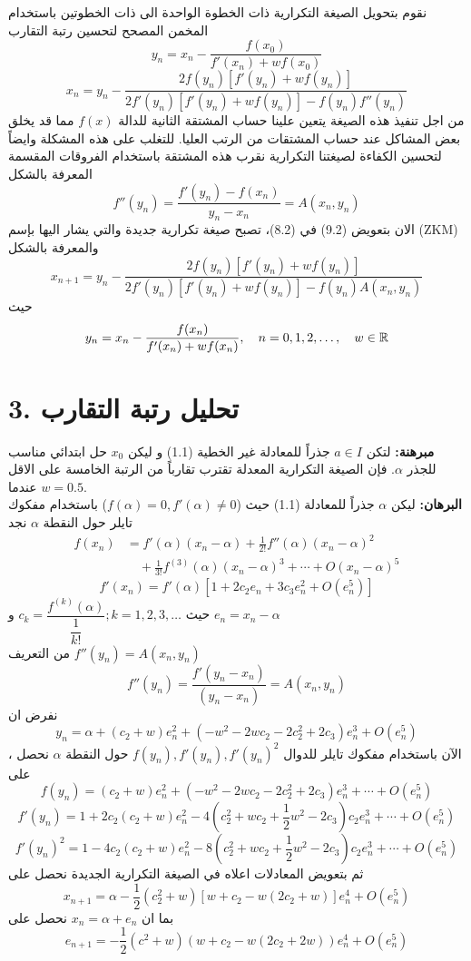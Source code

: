 نقوم بتحويل الصيغة التكرارية ذات الخطوة الواحدة الى ذات الخطوتين باستخدام المخمن المصحح لتحسين رتبة التقارب
\[
y_n = x_n - \frac{f(x_0)}{f'(x_n)+wf(x_0)}
\]
\begin{equation}
x_{n} = y_n - \frac{2f(y_n)[f'(y_n)+wf(y_n)]}{2f'(y_n)[f'(y_n)+wf(y_n)] - f(y_n)f''(y_n)} 
\end{equation}
من اجل تنفيذ هذه الصيغة يتعين علينا حساب المشتقة الثانية للدالة $f(x)$ مما قد يخلق بعض المشاكل عند حساب المشتقات من الرتب العليا. للتغلب على هذه المشكلة وايضاً لتحسين الكفاءة لصيغتنا التكرارية نقرب هذه المشتقة باستخدام الفروقات المقسمة المعرفة بالشكل
\begin{equation}
f''(y_n) = \frac{f'(y_n) - f(x_n)}{y_n - x_n} = A(x_n, y_n)
\end{equation}
الان بتعويض (9.2) في (8.2)، تصبح صيغة تكرارية جديدة والتي يشار اليها بإسم (ZKM) والمعرفة بالشكل
\begin{equation}
x_{n+1} = y_n - \frac{2f(y_n)[f'(y_n)+wf(y_n)]}{2f'(y_n) [f'(y_n) + wf(y_n)] -f(y_n)A(x_n, y_n)} 
\end{equation}
حيث
\begin{equation}
	y_n = x_n - \frac{f(x_n)}{f'(x_n) + wf(x_n)}, \quad n=0,1,2,\dots, \quad w\in\mathbb{R}
\end{equation}

\section*{3. تحليل رتبة التقارب}
\textbf{مبرهنة:} لتكن $a\in I$ جذراً للمعادلة غير الخطية (1.1) و ليكن $x_0$ حل ابتدائي مناسب للجذر $\alpha$. فإن الصيغة التكرارية المعدلة تقترب تقارباً من الرتبة الخامسة على الاقل عندما $w=0.5$.\\
\textbf{البرهان:} ليكن $\alpha$ جذراً للمعادلة (1.1) حيث ($f(\alpha)=0, f'(\alpha)\neq 0$) باستخدام مفكوك تايلر حول النقطة $\alpha$ نجد
\begin{align*}
	f(x_n) &= f'(\alpha)(x_n-\alpha) + \frac{1}{2!} f''(\alpha)(x_n-\alpha)^2\\
	&\quad + \frac{1}{3!} f^{(3)}(\alpha) (x_n-\alpha)^3 + \cdots + O(x_n-\alpha)^5
\end{align*}
\[
f'(x_n) = f'(\alpha) [1 + 2c_2e_n + 3c_3 e_n^2 + O(e_n^5)]
\]
حيث 
$c_k = \dfrac{f^{(k)}(\alpha)}{\dfrac{1}{k!}}; k=1,2,3,\dots$
و $e_n = x_n-\alpha$\\[10pt]
من التعريف
$f''(y_n) = A(x_n, y_n)$
\[
f''(y_n) = \frac{f'(y_n - x_n)}{(y_n - x_n)} = A(x_n, y_n)
\]
نفرض ان 
\[
y_n = \alpha + (c_2+w)e_n^2 + (-w^2-2wc_2-2c_2^2+2c_3)e_n^3 + O(e_n^{5})
\]
  ، الآن باستخدام مفكوك تايلر للدوال $f(y_n), f'(y_n) , f'(y_n)^2 $ حول النقطة $\alpha$ نحصل على 
\[
f(y_n) = (c_2+w)e_n^2 +  (-w^2-2wc_2-2c_2^2+2c_3)e_n^3 + \cdots + O(e_n^5)
\]
\[
f'(y_n) = 1 + 2c_2 (c_2+w)e_n^2 - 4(c_2^2 + wc_2+\frac{1}{2}w^2 - 2c_3)c_2e_n^3+\cdots+O(e_n^5)
\]
\[
f'(y_n)^2 = 1-4c_2(c_2+w)e_n^2 - 8(c_2^2 + wc_2 + \frac{1}{2}w^2-2c_3)c_2e_n^3 + \cdots +O(e_n^5)
\]
ثم بتعويض المعادلات اعلاه في الصيغة التكرارية الجديدة نحصل على 
\[
x_{n+1} = \alpha - \frac{1}{2}(c_2^2 + w)[w+c_2-w(2c_2+w)]e_n^4  + O(e_n^5)
\]
بما ان $x_n = \alpha +e_n$ نحصل على 
\[
e_{n+1} = -\frac{1}{2}(c^2 + w)(w+c_2-w(2c_2+2w))e_n^4 + O(e_n^5)
\]